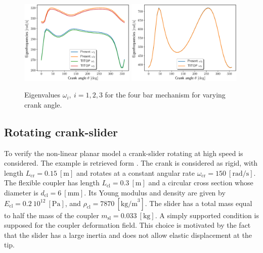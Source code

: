 \documentclass{svjour3}                     %
\begin{document}
	\begin{figure}[tb]
		\centering
		\includegraphics[width=0.49\textwidth]{FourBar_Om12_Chebbi.eps} 
		\includegraphics[width=0.49\textwidth]{FourBar_Om3_Chebbi.eps} 
		\caption{Eigenvalues $\omega_i, \ i=1,2,3$ for the four bar mechanism for varying crank angle.}
		\label{fig:omega_4bars}
	\end{figure}
	
	\subsection{Rotating crank-slider}
	To verify the non-linear planar model a crank-slider rotating at high speed is considered. The example is retrieved form \cite{Ellenbroek2018}.  The crank is considered as rigid, with length $L_{\text{cr}} = 0.15 \ [\mathrm{m}]$ and rotates at a constant angular rate $\omega_{\text{cr}} = 150 \ [\mathrm{rad/s}]$. The flexible coupler has length $L_{\text{cl}} = 0.3 \ [\mathrm{m}]$ and a circular cross section whose diameter is $d_{\text{cl}} = 6 \ [\mathrm{mm}]$. Its Young modulus and density are given by $E_{\text{cl}}=0.2 \ 10^{12} \ [\mathrm{Pa}]$, and $\rho_{\text{cl}}=7870 \ [\mathrm{kg/m}^3]$. The slider has a total mass equal to half the mass of the coupler $m_{\text{sl}} = 0.033 \ [\mathrm{kg}]$. A simply supported condition is supposed for the coupler deformation field. This choice is motivated by the fact that the slider has a large inertia and does not allow elastic displacement at the tip.
	
\end{document}
